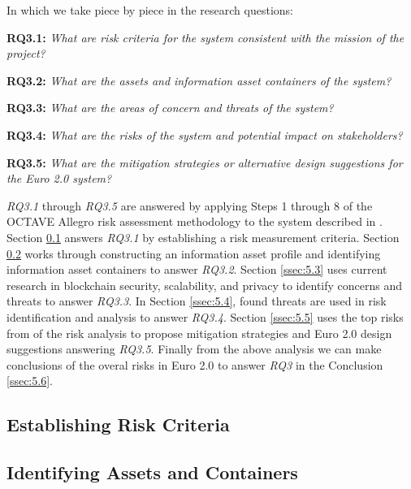 \documentclass[12pt]{article} %
\newcommand{\hypernameref}[1]{\hyperref[#1]{\nameref{#1}}}
\begin{document}
{{In which we take piece by piece in the research questions:
\begin{quoting}
	\textbf{RQ3.1: }\textit{What are risk criteria for the system consistent with the mission of the project?}
\end{quoting}
\begin{quoting}
	\textbf{RQ3.2: }\textit{What are the assets and information asset containers of the system?}
\end{quoting}
\begin{quoting}
	\textbf{RQ3.3: }\textit{What are the areas of concern and threats of the system?}
\end{quoting}
\begin{quoting}
	\textbf{RQ3.4: }\textit{What are the risks of the system and potential impact on stakeholders?}
\end{quoting}
\begin{quoting}
	\textbf{RQ3.5: }\textit{What are the mitigation strategies or alternative design suggestions for the Euro 2.0 system?}
\end{quoting}

\textit{RQ3.1} through \textit{RQ3.5} are answered by applying Steps 1 through 8 of the OCTAVE Allegro risk assessment methodology\cite{CaralliIntroducingOCTAVE2007} to the system described in \hypernameref{sec:3}. Section \ref{ssec:5.1} answers \textit{RQ3.1} by establishing a risk measurement criteria. Section \ref{ssec:5.2} works through constructing an information asset profile and identifying information asset containers to answer \textit{RQ3.2}. Section \ref{ssec:5.3} uses current research in blockchain security, scalability, and privacy to identify concerns and threats to answer \textit{RQ3.3}. In Section \ref{ssec:5.4}, found threats are used in risk identification and analysis to answer \textit{RQ3.4}. Section \ref{ssec:5.5} uses the top risks from of the risk analysis to propose mitigation strategies and Euro 2.0 design suggestions answering \textit{RQ3.5}. Finally from the above analysis we can make conclusions of the overal risks in Euro 2.0 to answer \textit{RQ3} in the Conclusion \ref{ssec:5.6}.

\subsection{Establishing Risk Criteria} \label{ssec:5.1}

\subsection{Identifying Assets and Containers} \label{ssec:5.2}

}}
\end{document}
